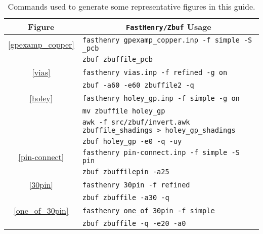 \begin{table}
\begin{center}
\begin{tabular}{cl}\hline
\multicolumn{1}{c}{Figure} & \multicolumn{1}{c}{{\tt FastHenry/Zbuf} Usage} \\ \hline
\protect\ref{gpexamp_copper} & \tt fasthenry gpexamp\_copper.inp -f simple -S \_pcb \\
& {\tt zbuf zbuffile\_pcb} \\
\hline
\protect\ref{vias} & {\tt fasthenry vias.inp -f refined -g on} \\
& {\tt zbuf -a60 -e60 zbuffile2 -q} \\
\hline
\protect\ref{holey} & {\tt fasthenry holey\_gp.inp -f simple -g on} \\
& {\tt mv zbuffile holey\_gp} \\
& {\tt awk -f src/zbuf/invert.awk zbuffile\_shadings > holey\_gp\_shadings} \\
& {\tt zbuf holey\_gp -e0 -q -uy} \\
\hline
\protect\ref{pin-connect} & {\tt fasthenry pin-connect.inp -f simple -S pin} \\
& {\tt zbuf zbuffilepin -a25} \\
\hline
\protect\ref{30pin} & {\tt fasthenry 30pin -f refined} \\
& {\tt zbuf zbuffile -a30 -q} \\
\hline
\protect\ref{one_of_30pin} & {\tt fasthenry one\_of\_30pin -f simple} \\
& {\tt zbuf zbuffile -q -e20 -a0} \\
\hline
\end{tabular}
\caption{Commands used to generate some representative figures in this guide.}
\label{dashmuse}
\end{center}
\end{table}



